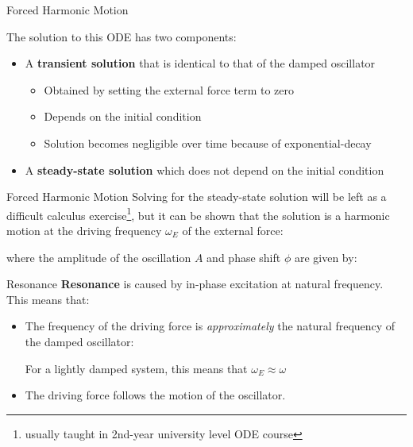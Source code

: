 \documentclass[12pt,compress,aspectratio=169]{beamer}
\begin{document}
\begin{frame}{Forced Harmonic Motion}
  
  The solution to this ODE has two components:
  \begin{itemize}
  \item A \textbf{transient solution} that is identical to that of the damped
    oscillator
    \begin{itemize}
    \item Obtained by setting the external force term to zero
    \item Depends on the initial condition
    \item Solution becomes negligible over time because of exponential-decay
    \end{itemize}
  \item A \textbf{steady-state solution} which does not depend on the initial
    condition
  \end{itemize}
\end{frame}



\begin{frame}{Forced Harmonic Motion}
  Solving for the steady-state solution will be left as a difficult calculus
  exercise\footnote{usually taught in 2nd-year university level ODE course},
  but it can be shown that the solution is a harmonic motion at the driving
  frequency $\omega_E$ of the external force:

  
  where the amplitude of the oscillation $A$ and phase shift $\phi$ are given
  by:

  \vspace{.3in}
\end{frame}



\begin{frame}{Resonance}
  \textbf{Resonance} is caused by in-phase excitation at natural frequency.
  This means that:
  \begin{itemize}
  \item The frequency of the driving force is \emph{approximately} the natural
    frequency of the damped oscillator:


    For a lightly damped system, this means that $\omega_E\approx\omega$
    
  \item The driving force follows the motion of the oscillator.
  \end{itemize}
\end{frame}
\end{document}
